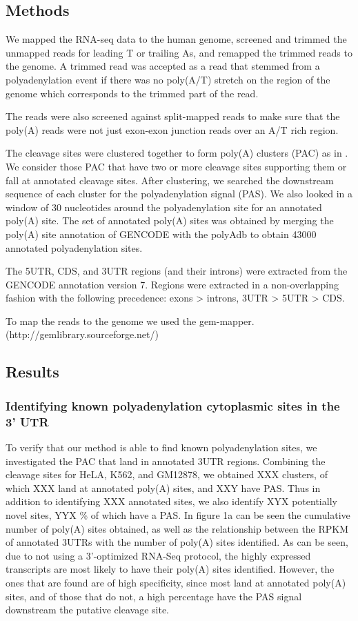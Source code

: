 \documentclass[a4paper]{article}
\begin{document}
\subsection{Methods}
We mapped the RNA-seq data to the human genome, screened and trimmed the
unmapped reads for leading T or trailing As, and remapped the trimmed reads to
the genome. A trimmed read was accepted as a read that stemmed from a polyadenylation
event if there was no poly(A/T) stretch on the region of the genome which
corresponds to the trimmed part of the read.

The reads were also screened against split-mapped reads to make sure that the
poly(A) reads were not just exon-exon junction reads over an A/T rich region.

The cleavage sites were clustered together to form poly(A) clusters (PAC) as in
\cite{tian_large-scale_2005}. We consider those PAC that have two or more
cleavage sites supporting them or fall at annotated cleavage sites. After
clustering, we searched the downstream sequence of each cluster for the
polyadenylation signal (PAS). We also looked in a window of 30 nucleotides
around the polyadenylation site for an annotated poly(A) site. The set of
annotated poly(A) sites was obtained by merging the poly(A) site annotation of
GENCODE with the polyAdb \cite{lee_polya_db_2007} to obtain 43000 annotated
polyadenylation sites.

The 5UTR, CDS, and 3UTR regions (and their introns) were extracted from the
GENCODE annotation version 7. Regions were extracted in a non-overlapping
fashion with the following precedence: exons > introns, 3UTR > 5UTR > CDS.

To map the reads to the genome we used the gem-mapper.
(http://gemlibrary.sourceforge.net/)

\subsection{Results}

\subsubsection{Identifying known polyadenylation cytoplasmic sites in the 3' UTR}
To verify that our method is able to find known polyadenylation sites, we
investigated the PAC that land in annotated 3UTR regions. Combining the
cleavage sites for  HeLA, K562, and GM12878, we obtained XXX clusters, of which
XXX land at annotated poly(A) sites, and XXY have PAS. Thus in addition to
identifying XXX annotated sites, we also identify XYX potentially novel sites,
YYX \% of which have a PAS. In figure 1a can be seen the cumulative number of
poly(A) sites obtained, as well as the relationship between the RPKM of
annotated 3UTRs with the number of poly(A) sites identified. As can be seen,
due to not using a 3'-optimized RNA-Seq protocol, the highly expressed
transcripts are most likely to have their poly(A) sites identified. However,
the ones that are found are of high specificity, since most land at annotated
poly(A) sites, and of those that do not, a high percentage have the PAS signal
downstream the putative cleavage site.
\end{document}
